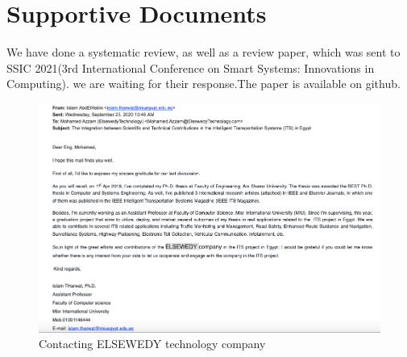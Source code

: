 \documentclass[12pt]{article}
\begin{document}
\newpage
\section{Supportive Documents}
We have done a systematic review, as well as a review paper, which was sent to SSIC 2021(3rd International
Conference on Smart Systems: Innovations in Computing). we are waiting for their response.The paper is available on github.
    \begin{figure}[h]
    \includegraphics[width=13cm]{5.png}
    \caption{Contacting ELSEWEDY technology company}
    \end{figure}
\end{document}
